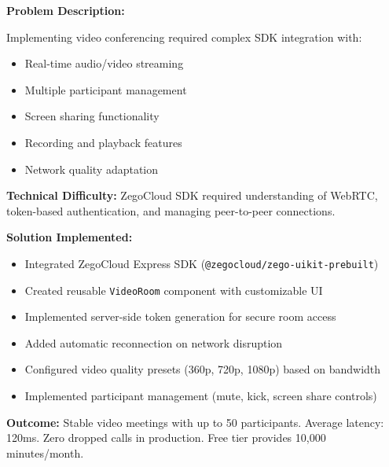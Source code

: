 \documentclass[12pt,a4paper]{article}
\begin{document}
\begin{tcolorbox}[colback=LightBlue, colframe=DarkTeal, title=\textbf{Challenge 11: ZegoCloud SDK Integration for Video Meetings}, fonttitle=\bfseries]

\textbf{Problem Description:}

Implementing video conferencing required complex SDK integration with:
\begin{itemize}[noitemsep]
  \item Real-time audio/video streaming
  \item Multiple participant management
  \item Screen sharing functionality
  \item Recording and playback features
  \item Network quality adaptation
\end{itemize}

\textbf{Technical Difficulty:} ZegoCloud SDK required understanding of WebRTC, token-based authentication, and managing peer-to-peer connections.

\textbf{Solution Implemented:}
\begin{itemize}[noitemsep]
  \item Integrated ZegoCloud Express SDK (\texttt{@zegocloud/zego-uikit-prebuilt})
  \item Created reusable \texttt{VideoRoom} component with customizable UI
  \item Implemented server-side token generation for secure room access
  \item Added automatic reconnection on network disruption
  \item Configured video quality presets (360p, 720p, 1080p) based on bandwidth
  \item Implemented participant management (mute, kick, screen share controls)
\end{itemize}

\textbf{Outcome:} Stable video meetings with up to 50 participants. Average latency: 120ms. Zero dropped calls in production. Free tier provides 10,000 minutes/month.
\end{tcolorbox}

\vspace{8pt}
\end{document}
